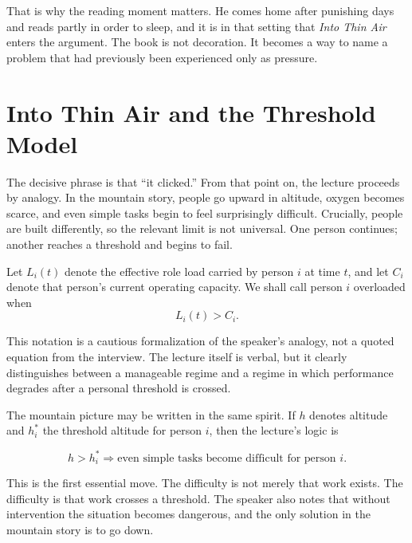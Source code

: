 That is why the reading moment matters. He comes home after punishing days and reads partly in order to sleep, and it is in that setting that \emph{Into Thin Air} enters the argument. The book is not decoration. It becomes a way to name a problem that had previously been experienced only as pressure.

\section{Into Thin Air and the Threshold Model}

The decisive phrase is that ``it clicked.'' From that point on, the lecture proceeds by analogy. In the mountain story, people go upward in altitude, oxygen becomes scarce, and even simple tasks begin to feel surprisingly difficult. Crucially, people are built differently, so the relevant limit is not universal. One person continues; another reaches a threshold and begins to fail.

\begin{definition}
Let \(L_i(t)\) denote the effective role load carried by person \(i\) at time \(t\), and let \(C_i\) denote that person's current operating capacity. We shall call person \(i\) overloaded when
\begin{equation}
L_i(t) > C_i.
\end{equation}
\end{definition}

\begin{remark}
This notation is a cautious formalization of the speaker's analogy, not a quoted equation from the interview. The lecture itself is verbal, but it clearly distinguishes between a manageable regime and a regime in which performance degrades after a personal threshold is crossed.
\end{remark}

The mountain picture may be written in the same spirit. If \(h\) denotes altitude and \(h_i^\ast\) the threshold altitude for person \(i\), then the lecture's logic is

\begin{equation}
h > h_i^\ast \Longrightarrow \text{even simple tasks become difficult for person } i.
\end{equation}

This is the first essential move. The difficulty is not merely that work exists. The difficulty is that work crosses a threshold. The speaker also notes that without intervention the situation becomes dangerous, and the only solution in the mountain story is to go down.

